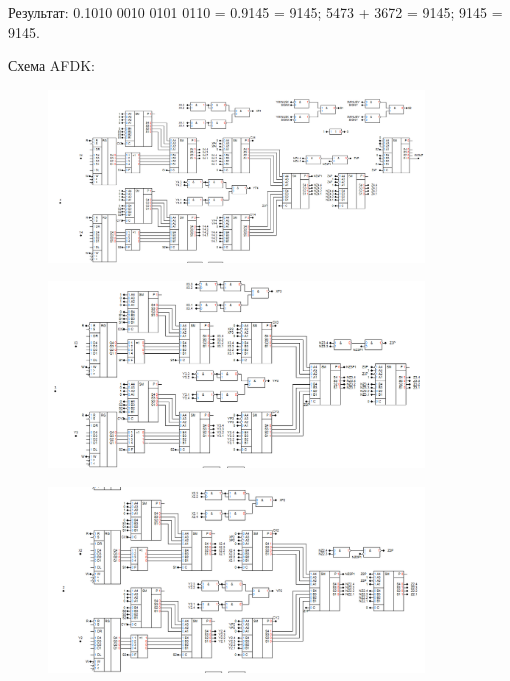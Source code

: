 \documentclass[12pt,a4paper]{article}
\begin{document}
    Результат: 0.1010 0010 0101 0110 = 0.9145 = 9145; 5473 + 3672 = 9145; 9145 = 9145.

    \vspace{1em}

    Схема AFDK:

    \begin{figure}[ht]
        \centering
        \includegraphics[width=0.89\textwidth]{3_1.png}
    \end{figure}

    \begin{figure}[ht]
        \centering
        \includegraphics[width=0.89\textwidth]{3_2.png}
    \end{figure}

    \newpage

    \begin{figure}[ht]
        \centering
        \includegraphics[width=0.89\textwidth]{3_3.png}
    \end{figure}
\end{document}
